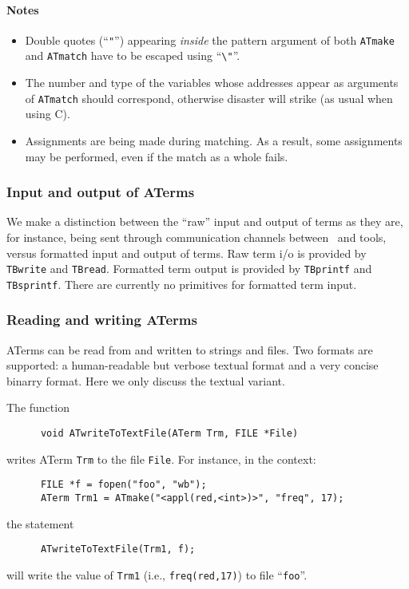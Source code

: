 \documentclass[twoside]{article} %
\begin{document}
\paragraph{Notes}
\begin{itemize}
\item Double quotes (``{\tt "}'') appearing {\em inside} the pattern argument
of both {\tt ATmake} and {\tt ATmatch} have to be escaped using ``\verb-\"-''.
\item The number and type of the variables whose addresses appear
as arguments of {\tt ATmatch} should correspond, otherwise disaster
will strike (as usual when using C).
\item Assignments are being made during matching. As a result, some assignments
may be performed, even if the match as a whole fails.

\end{itemize}

\subsubsection{\label{ATermIO}Input and output of ATerms}
We make a distinction between the ``raw'' input and output of terms
as they are, for instance, being sent through communication
channels between \TB\ and tools, versus formatted input and output
of terms. Raw term i/o is provided by {\tt TBwrite} and {\tt TBread}.
Formatted term output is provided by {\tt TBprintf} and {\tt TBsprintf}.
There are currently no primitives for formatted term input.

\subsubsection{\label{ATread/write}Reading and writing ATerms}

ATerms can be read from and written to strings and files.
Two formats are supported: a human-readable but verbose textual format
and a very concise binarry format. Here we only discuss the textual
variant.

The function
\begin{verbatim}
      void ATwriteToTextFile(ATerm Trm, FILE *File)
\end{verbatim}
writes ATerm {\tt Trm} to the file {\tt File}.
For instance, in the context:
\begin{verbatim}
      FILE *f = fopen("foo", "wb");
      ATerm Trm1 = ATmake("<appl(red,<int>)>", "freq", 17);
\end{verbatim}
the statement
\begin{verbatim}
      ATwriteToTextFile(Trm1, f);
\end{verbatim}
will write the value of {\tt Trm1} (i.e., {\tt freq(red,17)})
to file ``{\tt foo}''.
\end{document}
